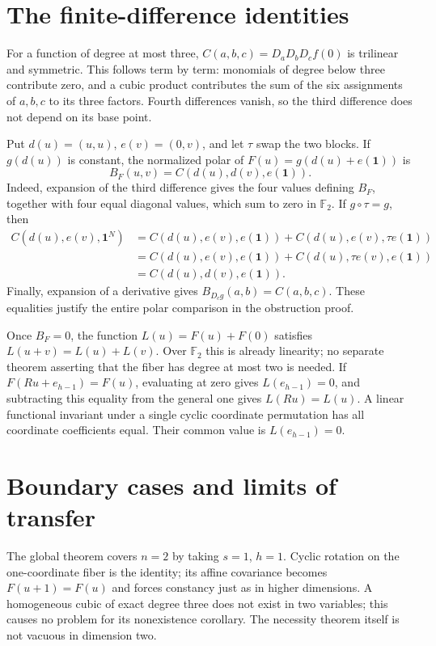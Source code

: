 \documentclass[11pt,a4paper]{article}
\newcommand{\F}{\mathbb F_2}
\newcommand{\one}{\mathbf1}
\begin{document}
\section{The finite-difference identities}
For a function of degree at most three, $C(a,b,c)=D_aD_bD_cf(0)$ is trilinear and symmetric. This follows term by term: monomials of degree below three contribute zero, and a cubic product contributes the sum of the six assignments of $a,b,c$ to its three factors. Fourth differences vanish, so the third difference does not depend on its base point.

Put $d(u)=(u,u)$, $e(v)=(0,v)$, and let $\tau$ swap the two blocks. If $g(d(u))$ is constant, the normalized polar of $F(u)=g(d(u)+e(\one))$ is
\[
 B_F(u,v)=C(d(u),d(v),e(\one)).
\]
Indeed, expansion of the third difference gives the four values defining $B_F$, together with four equal diagonal values, which sum to zero in $\F$. If $g\circ\tau=g$, then
\begin{align*}
 C(d(u),e(v),\one^N)
 &=C(d(u),e(v),e(\one))+C(d(u),e(v),\tau e(\one))\\
 &=C(d(u),e(v),e(\one))+C(d(u),\tau e(v),e(\one))\\
 &=C(d(u),d(v),e(\one)).
\end{align*}
Finally, expansion of a derivative gives $B_{D_cg}(a,b)=C(a,b,c)$. These equalities justify the entire polar comparison in the obstruction proof.

Once $B_F=0$, the function $L(u)=F(u)+F(0)$ satisfies $L(u+v)=L(u)+L(v)$. Over $\F$ this is already linearity; no separate theorem asserting that the fiber has degree at most two is needed. If $F(Ru+e_{h-1})=F(u)$, evaluating at zero gives $L(e_{h-1})=0$, and subtracting this equality from the general one gives $L(Ru)=L(u)$. A linear functional invariant under a single cyclic coordinate permutation has all coordinate coefficients equal. Their common value is $L(e_{h-1})=0$.

\section{Boundary cases and limits of transfer}
The global theorem covers $n=2$ by taking $s=1$, $h=1$. Cyclic rotation on the one-coordinate fiber is the identity; its affine covariance becomes $F(u+1)=F(u)$ and forces constancy just as in higher dimensions. A homogeneous cubic of exact degree three does not exist in two variables; this causes no problem for its nonexistence corollary. The necessity theorem itself is not vacuous in dimension two.
\end{document}
